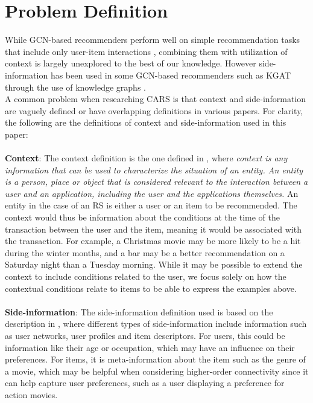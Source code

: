 \section{Problem Definition}\label{sec:problemdef}
While GCN-based recommenders perform well on simple recommendation tasks that include only user-item interactions \cite{NGCF,LightGCN}, combining them with utilization of context is largely unexplored to the best of our knowledge. However side-information has been used in some GCN-based recommenders such as KGAT through the use of knowledge graphs \cite{KGAT}.\\
A common problem when researching CARS is that context and side-information are vaguely defined or have overlapping definitions in various papers.
For clarity, the following are the definitions of context and side-information used in this paper:
\\\\
\textbf{Context}:
The context definition is the one defined in \cite{contextDefinition}, where \textit{context is any information that can be used to characterize the situation of an entity. An entity is a person, place or object that is considered relevant to the interaction between a user and an application, including the user and the applications themselves.}
An entity in the case of an RS is either a user or an item to be recommended.
The context would thus be information about the conditions at the time of the transaction between the user and the item, meaning it would be associated with the transaction.
For example, a Christmas movie may be more likely to be a hit during the winter months, and a bar may be a better recommendation on a Saturday night than a Tuesday morning.
While it may be possible to extend the context to include conditions related to the user, we focus solely on how the contextual conditions relate to items to be able to express the examples above.
\\\\
\textbf{Side-information}:
The side-information definition used is based on the description in \cite{SideInfoDefinition}, where different types of side-information include information such as user networks, user profiles and item descriptors.
For users, this could be information like their age or occupation, which may have an influence on their preferences.
For items, it is meta-information about the item such as the genre of a movie, which may be helpful when considering higher-order connectivity since it can help capture user preferences, such as a user displaying a preference for action movies.
